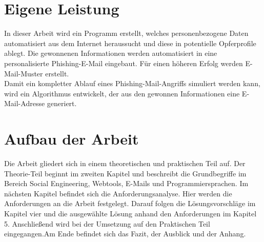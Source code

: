 

 	
\section{Eigene Leistung}
\label {sec:Eigene Leistung} 
In dieser Arbeit wird ein Programm erstellt, welches personenbezogene Daten automatisiert aus dem Internet heraussucht und diese in potentielle Opferprofile ablegt. Die gewonnenen Informationen werden  automatisiert in eine personalisierte Phishing-E-Mail eingebaut. Für einen höheren Erfolg werden E-Mail-Muster erstellt.\\
Damit ein kompletter Ablauf eines Phishing-Mail-Angriffs simuliert werden kann, wird ein Algorithmus entwickelt, der aus den gewonnen Informationen eine E-Mail-Adresse generiert.

\section{Aufbau der Arbeit}
\label {sec:Aufbau der Arbeit} 
Die Arbeit gliedert sich in einem theoretischen und praktischen Teil auf. Der Theorie-Teil beginnt im zweiten Kapitel und beschreibt die Grundbegriffe im Bereich Social Engineering, Webtools, E-Mails und Programmiersprachen. Im nächsten Kapitel befindet sich die Anforderungsanalyse. Hier werden die Anforderungen an die Arbeit festgelegt. Darauf folgen die Lösungsvorschläge im Kapitel vier und die ausgewählte Lösung anhand den Anforderungen im Kapitel 5. Anschließend wird bei der Umsetzung auf den Praktischen Teil eingegangen.Am Ende befindet sich das Fazit, der Ausblick und der Anhang.







